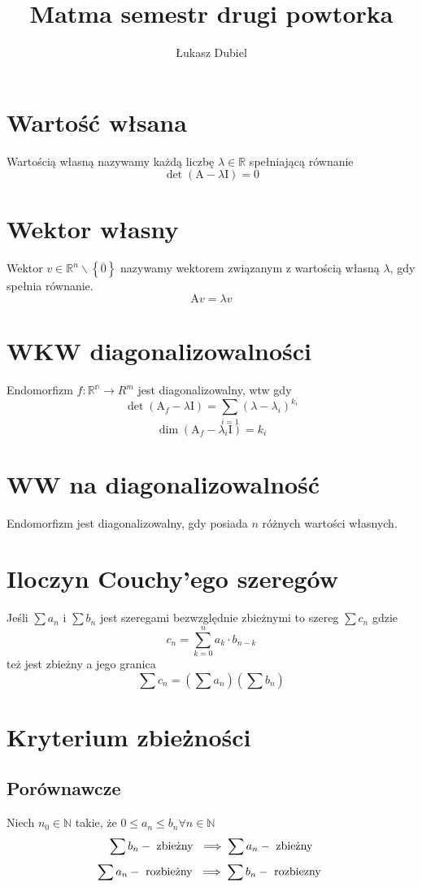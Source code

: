 \documentclass[11pt]{article}
\author{Łukasz Dubiel}
\title{Matma semestr drugi powtorka}
\begin{document}
\maketitle

\section{Wartość włsana}
Wartością własną nazywamy każdą liczbę $\lambda \in \mathbb{R}$ spełniającą równanie
$$ \det(\mathrm{A} - \lambda \mathrm{I}) = 0 $$

\section{Wektor własny}
Wektor $ v \in \mathbb{R}^n \backslash \left\{\overline{0}\right\}$ nazywamy wektorem związanym z wartością własną $\lambda$, gdy spełnia równanie.
$$ \mathrm{A} v = \lambda v $$

\section{WKW diagonalizowalności}
Endomorfizm $f : \mathbb{R^n} \to R^{m}$ jest diagonalizowalny, wtw gdy $$\det {(\mathrm{A}_f -\lambda \mathrm{I}) = \sum_{i=1}(\lambda - \lambda_i)^{k_i}}$$
$$ \dim{(\mathrm{A}_f - \lambda_i \mathrm{I})} = k_i $$ 

\section{WW na diagonalizowalność}
Endomorfizm jest diagonalizowalny, gdy posiada $n$ różnych wartości własnych.

\section{Iloczyn Couchy'ego szeregów}
Jeśli $\sum{a_n}$ i $\sum{b_n}$ jest szeregami bezwzględnie zbieżnymi to szereg $\sum{c_n}$ gdzie 
$$ c_n = \sum_{k=0}^{n}{a_k \cdot b_{n-k}}$$
też jest zbieżny a jego granica 
$$ \sum{c_n} = \left( \sum{a_n} \right)\left( \sum{b_n} \right) $$

\section{Kryterium zbieżności}
\subsection{Porównawcze}
Niech $n_0 \in \mathbb{N}$ takie, że $ 0 \leq a_n \leq b_n \forall n \in \mathbb{N}$
$$ \sum{b_n} - \hbox{ zbieżny } \implies \sum{a_n} - \hbox{ zbieżny}$$
$$ \sum{a_n} - \hbox{ rozbieżny } \implies \sum{b_n} - \hbox{ rozbiezny }$$
\end{document}
